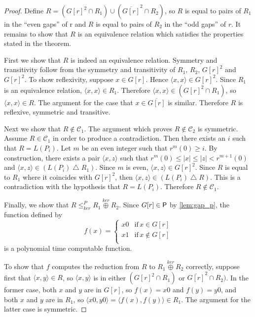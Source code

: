 \documentclass{article}
\theoremstyle{definition} \newtheorem{definition}[definition]{Definition}
\newcommand{\kj}{\overset{ker}{\oplus}} %
\newcommand{\kr}{\leq^{P}_{ker}} %
\newcommand{\symdiff}{\bigtriangleup} %
\newcommand{\pair}[2]{\langle#1,#2\rangle} %
\begin{document}
\begin{proof}
  Define $R=({G[r]}^2\cap R_1)\cup(\overline{G[r]}^2\cap R_2)$, so $R$ is equal
  to pairs of $R_1$ in the ``even gaps'' of r and $R$ is equal to pairs of
  $R_2$ in the ``odd gaps'' of $r$. It remains to show that $R$ is an
  equivalence relation which satisfies the properties stated in the theorem.

  First we show that $R$ is indeed an equivalence relation. Symmetry and
  transitivity follow from the symmetry and transitivity of $R_1$, $R_2$,
  ${G[r]}^2$ and ${G[r]}^2$. To show reflexivity, suppose $x\in G[r]$. Hence
  $\pair{x}{x}\in {G[r]}^2$. Since $R_1$ is an equivalence relation,
  $\pair{x}{x}\in R_1$. Therefore $\pair{x}{x}\in({G[r]}^2\cap R_1)$, so
  $\pair{x}{x}\in R$. The argument for the case that $x\in\overline{G[r]}$ is
  similar. Therefore $R$ is reflexive, symmetric and transitive.

  Next we show that $R\notin\mathcal{C}_1$. The argument which proves
  $R\notin\mathcal{C}_2$ is symmetric. Assume $R\in\mathcal{C}_1$ in order to
  produce a contradiction. Then there exists an $i$ such that $R=L(P_i)$. Let
  $m$ be an even integer such that $r^m(0)\geq i$. By construction, there
  exists a pair $\pair{x}{z}$ such that $r^m(0)\leq|x|\leq|z|<r^{m+1}(0)$ and
  $\pair{x}{z}\in(L(P_i)\symdiff R_1)$. Since $m$ is even, $\pair{x}{z}\in
  {G[r]}^2$. Since $R$ is equal to $R_1$ where it coincides with ${G[r]}^2$,
  then $\pair{x}{z}\in(L(P_i)\symdiff R)$. This is a contradiction with the
  hypothesis that $R=L(P_i)$. Therefore $R\notin\mathcal{C}_1$.

  Finally, we show that $R\kr R_1\kj R_2$. Since $G[r]\in\P$ by
  \autoref{lem:gap_p}, the function defined by
  \begin{displaymath}
    f(x)=
    \begin{cases}
      x0 & \text{if}\, x\in G[r]\\
      x1 & \text{if}\, x\notin G[r]\\
    \end{cases}
  \end{displaymath}
  is a polynomial time computable function.

  To show that $f$ computes the reduction from $R$ to $R_1\kj R_2$ correctly,
  suppose first that $\pair{x}{y}\in R$, so $\pair{x}{y}$ is in either
  $({G[r]}^2\cap R_1)$ or $\overline{G[r]}^2\cap R_2)$. In the former case,
  both $x$ and $y$ are in $G[r]$, so $f(x)=x0$ and $f(y)=y0$, and both $x$ and
  $y$ are in $R_1$, so $\pair{x0}{y0}=\pair{f(x)}{f(y)}\in R_1$. The argument
  for the latter case is symmetric.


\end{proof}
\end{document}
